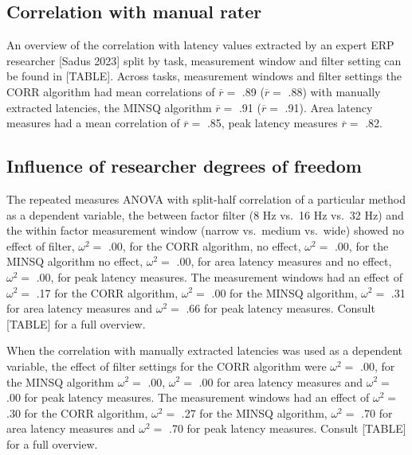 \documentclass[
  man]{apa7}
\begin{document}
\hypertarget{correlation-with-manual-rater}{%
\subsection{Correlation with manual rater}\label{correlation-with-manual-rater}}

An overview of the correlation with latency values extracted by an expert ERP researcher {[}Sadus 2023{]} split by task, measurement window and filter setting can be found in {[}TABLE{]}. Across tasks, measurement windows and filter settings the CORR algorithm had mean correlations of \(\overline{r} =\) .89 (\(\overline{r} =\) .88) with manually extracted latencies, the MINSQ algorithm \(\overline{r} =\) .91 (\(\overline{r} =\) .91). Area latency measures had a mean correlation of \(\overline{r} =\) .85, peak latency measures \(\overline{r} =\) .82.

\hypertarget{influence-of-researcher-degrees-of-freedom}{%
\subsection{Influence of researcher degrees of freedom}\label{influence-of-researcher-degrees-of-freedom}}

The repeated measures ANOVA with split-half correlation of a particular method as a dependent variable, the between factor filter (8 Hz vs.~16 Hz vs.~32 Hz) and the within factor measurement window (narrow vs.~medium vs.~wide) showed no effect of filter, \(\omega^2 =\) .00, for the CORR algorithm, no effect, \(\omega^2 =\) .00, for the MINSQ algorithm no effect, \(\omega^2 =\) .00, for area latency measures and no effect, \(\omega^2 =\) .00, for peak latency measures. The measurement windows had an effect of \(\omega^2 =\) .17 for the CORR algorithm, \(\omega^2 =\) .00 for the MINSQ algorithm, \(\omega^2 =\) .31 for area latency measures and \(\omega^2 =\) .66 for peak latency measures. Consult {[}TABLE{]} for a full overview.

When the correlation with manually extracted latencies was used as a dependent variable, the effect of filter settings for the CORR algorithm were \(\omega^2 =\) .00, for the MINSQ algorithm \(\omega^2 =\) .00, \(\omega^2 =\) .00 for area latency measures and \(\omega^2 =\) .00 for peak latency measures. The measurement windows had an effect of \(\omega^2 =\) .30 for the CORR algorithm, \(\omega^2 =\) .27 for the MINSQ algorithm, \(\omega^2 =\) .70 for area latency measures and \(\omega^2 =\) .70 for peak latency measures. Consult {[}TABLE{]} for a full overview.
\end{document}
